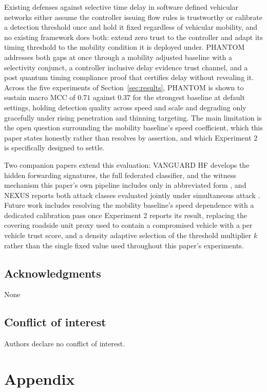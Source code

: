 \documentclass[final,5p,twocolumn]{elsarticle}
\theoremstyle{remark}
\theoremstyle{plain}
\begin{document}
Existing defenses against selective time delay in software defined
vehicular networks either assume the controller issuing flow rules is
trustworthy or calibrate a detection threshold once and hold it fixed
regardless of vehicular mobility, and no existing framework does both:
extend zero trust to the controller and adapt its timing threshold to the
mobility condition it is deployed under. PHANTOM addresses both gaps at
once through a mobility adjusted baseline with a selectivity conjunct, a
controller inclusive delay evidence trust channel, and a post quantum
timing compliance proof that certifies delay without revealing it. Across
the five experiments of Section~\ref{sec:results}, PHANTOM is shown to
sustain macro MCC of $0.71$ against $0.37$ for the strongest baseline at
default settings, holding detection quality across speed and scale and
degrading only gracefully under rising penetration and thinning targeting. The main limitation is the open question surrounding the
mobility baseline's speed coefficient, which this paper states honestly
rather than resolves by assertion, and which Experiment 2 is specifically
designed to settle.

Two companion papers extend this evaluation: VANGUARD HF develops the
hidden forwarding signatures, the full federated classifier, and the
witness mechanism this paper's own pipeline includes only in abbreviated
form \cite{VanguardHF2026}, and NEXUS reports both attack classes evaluated
jointly under simultaneous attack \cite{Nexus2026}. Future work includes
resolving the mobility baseline's speed dependence with a dedicated
calibration pass once Experiment 2 reports its result, replacing the
covering roadside unit proxy used to contain a compromised vehicle with a
per vehicle trust score, and a density adaptive selection of the threshold
multiplier $k$ rather than the single fixed value used throughout this
paper's experiments.

\subsection{Acknowledgments}
\noindent None

\subsection{Conflict of interest}
\noindent Authors declare no conflict of interest.

\section[\appendixname~\thesection]{Appendix}
\label{appendix}
\end{document}
